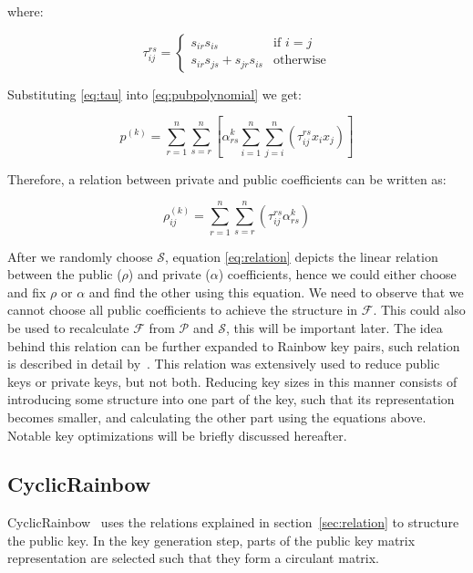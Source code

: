 \documentclass{ufsctex/ufsctex}
\begin{document}
where:

\begin{equation*}
\tau^{rs}_{ij} =
\begin{cases}
	s_{ir} s_{is} &\mbox{if } i=j \\
	s_{ir} s_{js} + s_{jr} s_{is} &\mbox{otherwise}
\end{cases}
\end{equation*}

Substituting \ref{eq:tau} into \ref{eq:pubpolynomial} we get:

\begin{equation}
p^{(k)} = \sum_{r=1}^n \sum_{s=r}^n
\left[
\alpha^{k}_{rs} \sum_{i=1}^{n}\sum_{j=i}^n \left( \tau^{rs}_{ij} x_i x_j \right)
\right]
\end{equation}

Therefore, a relation between private and public coefficients can be written as:

\begin{equation}\label{eq:relation}
\rho^{(k)}_{ij} = \sum_{r=1}^{n}\sum_{s=r}^n
\left( \tau^{rs}_{ij} \alpha^{k}_{rs} \right)
\end{equation}

After we randomly choose $\mathcal{S}$, equation \ref{eq:relation} depicts the
linear relation between the public ($\rho$) and private ($\alpha$)
coefficients, hence we could either choose and fix $\rho$ or $\alpha$ and find
the other using this equation. We need to observe that we cannot choose all
public coefficients to achieve the structure in $\mathcal{F}$. This could also
be used to recalculate $\mathcal{F}$ from $\mathcal{P}$ and $\mathcal{S}$, this
will be important later. The idea behind this relation can be further expanded
to Rainbow key pairs, such relation is described in detail
by~\cite{petzoldt2011small}. This relation was extensively used to reduce
public keys or private keys, but not both. Reducing key sizes in this manner
consists of introducing some structure into one part of the key, such that its
representation becomes smaller, and calculating the other part using the
equations above. Notable key optimizations will be briefly discussed hereafter.



\subsection{CyclicRainbow}

CyclicRainbow~\cite{petzoldt2010cyclicrainbow} uses the relations explained in
section~\ref{sec:relation} to structure the public key. In the key generation
step, parts of the public key matrix representation are selected such that they
form a circulant matrix.
\end{document}
